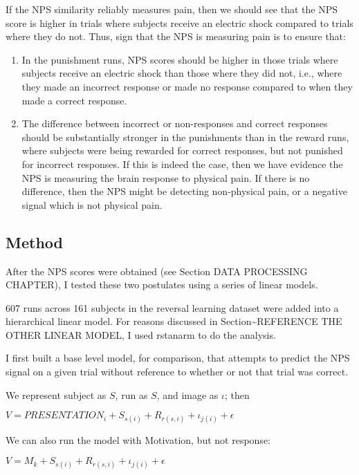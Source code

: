 \documentclass[]{article}
\providecommand{\tightlist}{%
  \setlength{\itemsep}{0pt}\setlength{\parskip}{0pt}}
\begin{document}
If the NPS similarity reliably measures pain, then we should see that
the NPS score is higher in trials where subjects receive an electric
shock compared to trials where they do not. Thus, sign that the NPS is
measuring pain is to ensure that:

\begin{enumerate}
\def\labelenumi{\arabic{enumi}.}
\tightlist
\item
  In the punishment runs, NPS scores should be higher in those trials
  where subjects receive an electric shock than those where they did
  not, i.e., where they made an incorrect response or made no response
  compared to when they made a correct response.
\item
  The difference between incorrect or non-responses and correct
  responses should be substantially stronger in the punishments than in
  the reward runs, where subjects were being rewarded for correct
  responses, but not punished for incorrect responses. If this is indeed
  the case, then we have evidence the NPS is measuring the brain
  response to physical pain. If there is no difference, then the NPS
  might be detecting non-physical pain, or a negative signal which is
  not physical pain.
\end{enumerate}

\subsection{Method}\label{method}

After the NPS scores were obtained (see Section DATA PROCESSING
CHAPTER), I tested these two postulates using a series of linear models.

607 runs across 161 subjects in the reversal learning dataset were added
into a hierarchical linear model. For reasons discussed in
Section\textasciitilde{}REFERENCE THE OTHER LINEAR MODEL, I used
rstanarm to do the analysis.

I first built a base level model, for comparison, that attempts to
predict the NPS signal on a given trial without reference to whether or
not that trial was correct.

We represent subject as \(S\), run as \(S\), and image as \(\iota\);
then

\(V=\mathit{PRESENTATION}_{i} + S_{s(i)} + R_{r(s,i)} + \iota_{j(i)} + \epsilon\)\label{eq:PainBaseNoMotivation}

We can also run the model with Motivation, but not response:

\(V=M_k + S_{s(i)} + R_{r(s,i)} + \iota_{j(i)} + \epsilon\)\label{eq:PainBaseNoResponse}
\end{document}
